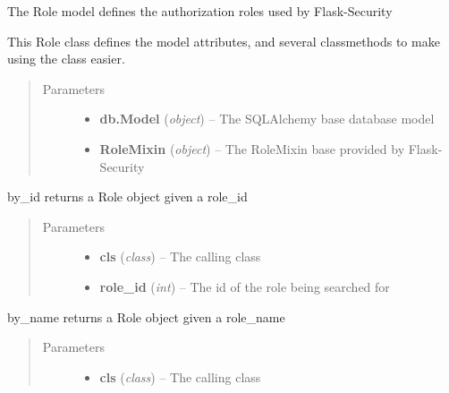 \documentclass[letterpaper,10pt,english]{sphinxmanual}
\begin{document}
\begin{fulllineitems}
\label{dev-users:cagenix.users.models.Role}
The Role model defines the authorization roles used by Flask-Security

This Role class defines the model attributes, and several classmethods to
make using the class easier.
\begin{quote}\begin{description}
\item[{Parameters}] \leavevmode\begin{itemize}
\item {} 
\textbf{db.Model} (\emph{object}) -- The SQLAlchemy base database model

\item {} 
\textbf{RoleMixin} (\emph{object}) -- The RoleMixin base provided by Flask-Security

\end{itemize}

\end{description}\end{quote}

\begin{fulllineitems}
\label{dev-users:cagenix.users.models.Role.by_id}
by\_id returns a Role object given a role\_id
\begin{quote}\begin{description}
\item[{Parameters}] \leavevmode\begin{itemize}
\item {} 
\textbf{cls} (\emph{class}) -- The calling class

\item {} 
\textbf{role\_id} (\emph{int}) -- The id of the role being searched for

\end{itemize}

\end{description}\end{quote}

\end{fulllineitems}


\begin{fulllineitems}
\label{dev-users:cagenix.users.models.Role.by_name}
by\_name returns a Role object given a role\_name
\begin{quote}\begin{description}
\item[{Parameters}] \leavevmode\begin{itemize}
\item {} 
\textbf{cls} (\emph{class}) -- The calling class


\end{itemize}
\end{description}
\end{quote}
\end{fulllineitems}
\end{fulllineitems}
\end{document}
